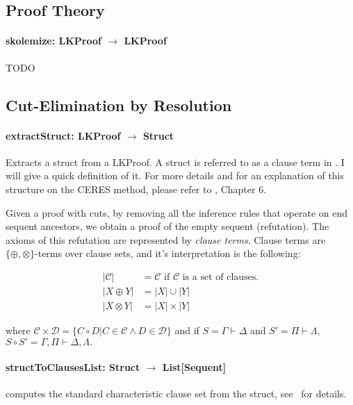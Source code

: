 \documentclass[a4paper, 11pt]{report}
\begin{document}
\subsection{Proof Theory}

\paragraph{\textbf{skolemize: LKProof $\rightarrow$ LKProof}}
{\color{red}TODO}

\subsection{Cut-Elimination by Resolution}


\paragraph{\textbf{extractStruct: LKProof $\rightarrow$ Struct}}
Extracts a struct from a LKProof. A struct is referred to as a clause term in
\cite{Baaz2011}. I will give a quick definition of it. For more details and
for an explanation of this structure on the CERES method, please refer to
\cite{Baaz2011}, Chapter 6.

Given a proof with cuts, by removing all the inference rules that operate on end
sequent ancestors, we obtain a proof of the empty sequent (refutation). The
axioms of this refutation are represented by \textit{clause terms}. Clause
terms are $\{\oplus, \otimes\}$-terms over clause sets, and it's interpretation
is the following:

\begin{align*}
|\mathcal{C}| &= \mathcal{C} \text{ if $\mathcal{C}$ is a set of clauses.}\\
|X \oplus Y| &= |X| \cup |Y|\\
|X \otimes Y| &= |X| \times |Y|
\end{align*}

where $\mathcal{C} \times \mathcal{D} = \{ C \circ D | C \in \mathcal{C} \wedge
D \in \mathcal{D}\}$ and if $S = \Gamma \vdash \Delta$ and $S' = \Pi \vdash
\Lambda$, $S \circ S' = \Gamma, \Pi \vdash \Delta, \Lambda.$

\paragraph{\textbf{structToClausesList: Struct $\rightarrow$ List[Sequent]}} computes
the standard characteristic clause set
from the struct, see~\cite[Section 4.2.1]{WoltzenlogelPaleo09General} for details.
\end{document}

